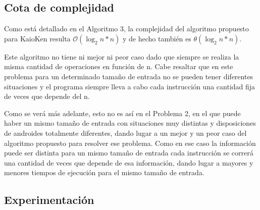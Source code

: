 \documentclass[10pt,a4paper]{article}
\begin{document}
\newpage
\subsection{Cota de complejidad}
\par{Como está detallado en el Algoritmo 3, la complejidad del algoritmo propuesto para KaioKen resulta $\mathcal{O}(\log _{2} n * n)$ y de hecho también es $\mathcal{\theta}(\log _{2} n * n)$}.
\par{Este algoritmo no tiene ni mejor ni peor caso dado que siempre se realiza la misma cantidad de operaciones en función de n. Cabe resaltar que en este problema para un determinado tamaño de entrada no se pueden tener diferentes situaciones y el programa siempre lleva a cabo cada instrucción una cantidad fija de veces que depende del n.}
\par{Como se verá más adelante, esto no es así en el Problema 2, en el que puede haber un mismo tamaño de entrada con situaciones muy distintas y disposiciones de androides totalmente diferentes, dando lugar a un mejor y un peor caso del algoritmo propuesto para resolver ese problema. Como en ese caso la información puede ser distinta para un mismo tamaño de entrada cada instrucción se correrá una cantidad de veces que depende de esa información, dando lugar a mayores y menores tiempos de ejecución para el mismo tamaño de entrada.}


\subsection{Experimentación}
\end{document}
